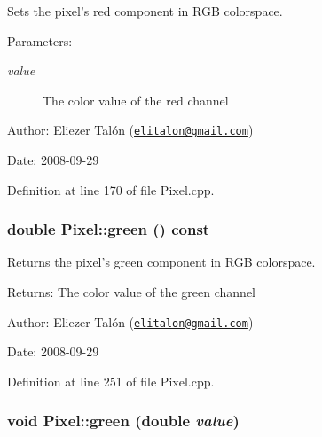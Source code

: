 Sets the pixel's red component in RGB colorspace. 

\begin{Desc}
\item[Parameters:]
\begin{description}
\item[{\em value}]The color value of the red channel\end{description}
\end{Desc}
\begin{Desc}
\item[Author:]Eliezer Talón (\href{mailto:elitalon@gmail.com}{\tt elitalon@gmail.com}) \end{Desc}
\begin{Desc}
\item[Date:]2008-09-29 \end{Desc}


Definition at line 170 of file Pixel.cpp.\hypertarget{class_pixel_71606a21fe4efc55a5ce5bb318b629f7}{
\subsubsection[green]{\setlength{\rightskip}{0pt plus 5cm}double Pixel::green () const}}
\label{class_pixel_71606a21fe4efc55a5ce5bb318b629f7}


Returns the pixel's green component in RGB colorspace. 

\begin{Desc}
\item[Returns:]The color value of the green channel\end{Desc}
\begin{Desc}
\item[Author:]Eliezer Talón (\href{mailto:elitalon@gmail.com}{\tt elitalon@gmail.com}) \end{Desc}
\begin{Desc}
\item[Date:]2008-09-29 \end{Desc}


Definition at line 251 of file Pixel.cpp.\hypertarget{class_pixel_98aaded2bc7bf4708edaaf2445acae0f}{
\subsubsection[green]{\setlength{\rightskip}{0pt plus 5cm}void Pixel::green (double {\em value})}}
\label{class_pixel_98aaded2bc7bf4708edaaf2445acae0f}


